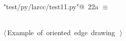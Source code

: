 \documentclass[11pt,oneside]{article}	%
\begin{document}
\begin{flushleft} \small \label{scrap35}
\protect{}\verb@"test/py/larcc/test11.py"@\nobreak\ {\footnotesize 22a }$\equiv$
\vspace{-1ex}
\begin{list}{}{} \item
\mbox{}\verb@@\\
\mbox{}\verb@@\hbox{$\langle\,$Example of oriented edge drawing\nobreak\ {\footnotesize {}}$\,\rangle$}\verb@@\\
\mbox{}\verb@@{\NWsep}
\end{list}
\vspace{-2ex}
\end{flushleft}
\end{document}
